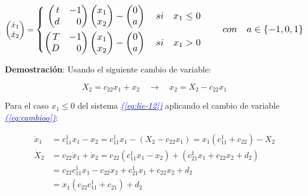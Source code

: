 \documentclass[12pt,a4paper]{report} %
\newcommand{\eref}[1]{\hyperref[#1]{\textcolor{blue}{\textit{(\ref*{#1})}}}}
\begin{document}
	\begin{equation}
		\begin{pmatrix*}[r]
			\dot{x}_1 \\ \dot{x}_2
		\end{pmatrix*}=
		\label{eq:lienard}
		\scalebox{1.2}{$\displaystyle
			\left\{
			\begin{aligned}
				\begin{pmatrix*}[r]
					t & -1\\
					d & 0
				\end{pmatrix*}\begin{pmatrix*}[r]
				x_1\\x_2
				\end{pmatrix*}-\begin{pmatrix}
				0\\a
				\end{pmatrix} \quad si \quad x_1\leq 0 \\
				\begin{pmatrix*}[r]
					T & -1\\
					D & 0
				\end{pmatrix*}\begin{pmatrix*}[r]
				x_1\\x_2
				\end{pmatrix*}-\begin{pmatrix}
					0\\a
				\end{pmatrix} \quad si \quad x_1 > 0
			\end{aligned}
			\right. \qquad con\quad a \in \left\{-1,0,1\right\}
			$}
	\end{equation}\smallskip

	
	\textbf{Demostración}: Usando el siguiente cambio de variable:
	
	\begin{equation}
		\label{eq:cambioo}
		X_2=c_{22}x_1+x_2\quad \rightarrow \quad x_2=X_2-c_{22}x_1
	\end{equation}\smallskip
	
	Para el caso $x_1\leq 0$ del sistema \eref{eq:lie-12} aplicando el cambio de variable \eref{eq:cambioo}:
	
		\begin{equation}
		\label{eq:cambio2}
		\begin{aligned}
			\dot{x}_1&=c_{11}^1x_1-x_2=c_{11}^1x_1-(X_2-c_{22}x_1)=x_1(c_{11}^1+c_{22})-X_2 \\[2mm]
			\dot{X}_2&=c_{22}\dot{x}_1+\dot{x}_2=c_{22}(c_{11}^1x_1-x_2)+(c_{21}^1x_1+c_{22}x_2+d_2) \\[2mm]
			&=c_{22}c_{11}^1x_1-c_{22}x_2+c_{21}^1x_1+c_{22}x_2+d_2 \\[2mm]
			&=x_1(c_{22}c_{11}^1+c_{21})+d_2
		\end{aligned}
		\end{equation}\smallskip
	
\end{document}
